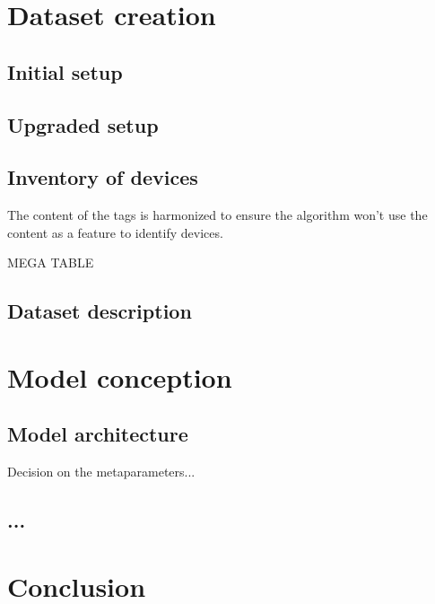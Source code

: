 \documentclass[paper=a4, fontsize=11pt]{scrartcl}
\begin{document}

\newpage


\newpage

\renewcommand{\contentsname}{Table of contents}
\tableofcontents
\newpage


\newpage


\newpage

\section{Dataset creation}

\subsection{Initial setup}

\subsection{Upgraded setup}

\subsection{Inventory of devices}

The content of the tags is harmonized to ensure the algorithm won't use the content as a feature to identify devices.

MEGA TABLE

\subsection{Dataset description}

\section{Model conception}

\subsection{Model architecture}

Decision on the metaparameters...

\subsection{...}

\section{Conclusion}

\printbibliography[heading=bibintoc, title={Bibliography}]
\newpage


\listoffigures

\listoftables


\end{document}
